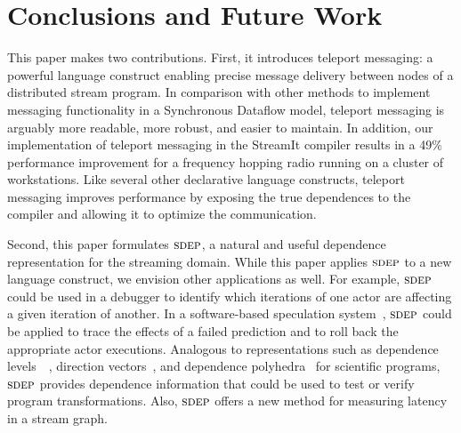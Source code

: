 \section{Conclusions and Future Work}
\label{sec:conclusion}

This paper makes two contributions.  First, it introduces teleport
messaging: a powerful language construct enabling precise message
delivery between nodes of a distributed stream program.  In comparison
with other methods to implement messaging functionality in a
Synchronous Dataflow model, teleport messaging is arguably more
readable, more robust, and easier to maintain.  In addition, our
implementation of teleport messaging in the StreamIt compiler results
in a 49\% performance improvement for a frequency hopping radio
running on a cluster of workstations.  Like several other declarative
language constructs, teleport messaging improves performance by
exposing the true dependences to the compiler and allowing it to
optimize the communication.


Second, this paper formulates $\textsc{sdep}$, a natural and useful dependence
representation for the streaming domain.  While this paper applies
$\textsc{sdep}$ to a new language construct, we envision other applications as
well.  For example, $\textsc{sdep}$ could be used in a debugger to identify
which iterations of one actor are affecting a given iteration of
another.  In a software-based speculation system~\cite{frank-thesis},
$\textsc{sdep}$ could be applied to trace the effects of a failed prediction
and to roll back the appropriate actor executions.  Analogous to
representations such as dependence levels~~\cite{AK82}, direction
vectors~\cite{wolfe82}, and dependence polyhedra~\cite{Irig88} for
scientific programs, $\textsc{sdep}$ provides dependence information that
could be used to test or verify program transformations.  Also,
$\textsc{sdep}$ offers a new method for measuring latency in a stream graph.

